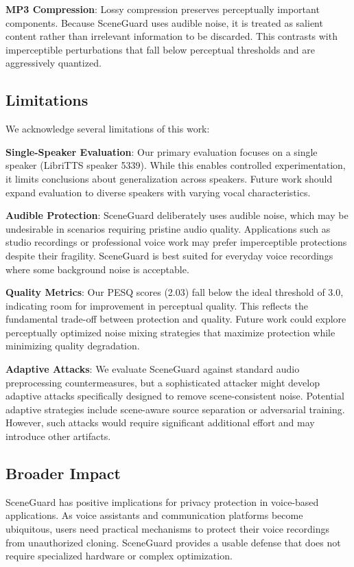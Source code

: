 \textbf{MP3 Compression}: Lossy compression preserves perceptually important components. Because SceneGuard uses audible noise, it is treated as salient content rather than irrelevant information to be discarded. This contrasts with imperceptible perturbations that fall below perceptual thresholds and are aggressively quantized.

\subsection{Limitations}

We acknowledge several limitations of this work:

\textbf{Single-Speaker Evaluation}: Our primary evaluation focuses on a single speaker (LibriTTS speaker 5339). While this enables controlled experimentation, it limits conclusions about generalization across speakers. Future work should expand evaluation to diverse speakers with varying vocal characteristics.

\textbf{Audible Protection}: SceneGuard deliberately uses audible noise, which may be undesirable in scenarios requiring pristine audio quality. Applications such as studio recordings or professional voice work may prefer imperceptible protections despite their fragility. SceneGuard is best suited for everyday voice recordings where some background noise is acceptable.

\textbf{Quality Metrics}: Our PESQ scores (2.03) fall below the ideal threshold of 3.0, indicating room for improvement in perceptual quality. This reflects the fundamental trade-off between protection and quality. Future work could explore perceptually optimized noise mixing strategies that maximize protection while minimizing quality degradation.

\textbf{Adaptive Attacks}: We evaluate SceneGuard against standard audio preprocessing countermeasures, but a sophisticated attacker might develop adaptive attacks specifically designed to remove scene-consistent noise. Potential adaptive strategies include scene-aware source separation or adversarial training. However, such attacks would require significant additional effort and may introduce other artifacts.

\subsection{Broader Impact}

SceneGuard has positive implications for privacy protection in voice-based applications. As voice assistants and communication platforms become ubiquitous, users need practical mechanisms to protect their voice recordings from unauthorized cloning. SceneGuard provides a usable defense that does not require specialized hardware or complex optimization.

